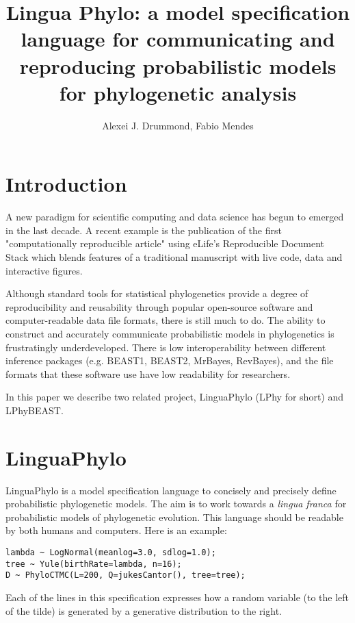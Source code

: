 \documentclass[11pt]{article}
\begin{document}
\title{Lingua Phylo: a model specification language for communicating and reproducing probabilistic models for phylogenetic analysis}
\author{Alexei J. Drummond, Fabio Mendes}
\date{}
\maketitle


\section{Introduction}

A new paradigm for scientific computing and data science has begun to emerged in the last decade. A recent example is the publication of the first "computationally reproducible article" using eLife's Reproducible Document Stack which blends features of a traditional manuscript with live code, data and interactive figures.

Although standard tools for statistical phylogenetics provide a degree of reproducibility and reusability through popular open-source software and computer-readable data file formats, there is still much to do. The ability to construct and accurately communicate probabilistic models in phylogenetics is frustratingly underdeveloped. There is low interoperability between different inference packages (e.g. BEAST1, BEAST2, MrBayes, RevBayes), and the file formats that these software use have low readability for researchers.

In this paper we describe two related project, LinguaPhylo (LPhy for short) and LPhyBEAST. 



\section{ LinguaPhylo}

LinguaPhylo is a model specification language to concisely and precisely define probabilistic phylogenetic models. The aim is to work towards a {\it lingua franca} for probabilistic models of phylogenetic evolution. This language should be readable by both humans and computers. Here is an example:

\begin{verbatim}
lambda ~ LogNormal(meanlog=3.0, sdlog=1.0);
tree ~ Yule(birthRate=lambda, n=16);
D ~ PhyloCTMC(L=200, Q=jukesCantor(), tree=tree);
\end{verbatim}

Each of the lines in this specification expresses how a random variable (to the left of the tilde) is generated by a generative distribution to the right.
\end{document}
